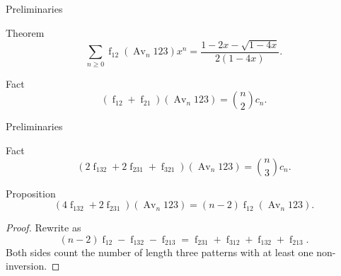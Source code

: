 \documentclass{beamer}
\DeclareMathOperator{\num}{f}
\DeclareMathOperator{\Av}{Av}
\newcommand{\Avn}{\Av_n   123 }
\begin{document}
\begin{frame}{Preliminaries}
  \pause

  \begin{block}{Theorem}
    $$\sum_{n \geq 0} \num_{12}(\Av_n 123) x^n = 
      \frac{1 - 2x - \sqrt{1-4x}}{2(1-4x)}.$$
  \end{block}

  \pause

  \begin{block}{Fact}
    $$ (\num_{12} + \num_{21})(\Avn)  = \binom{n}{2} c_n .$$ 
  \end{block}
\end{frame}

\begin{frame}{Preliminaries}
  
  \begin{block}{Fact}
    $$ (2 \num_{132} + 2 \num_{231} +
      \num_{321})(\Avn) = \binom{n}{3} c_n.$$
  \end{block}

  \pause

  \begin{block}{Proposition}
    $$ (4 \num_{132} + 2 \num_{231})(\Avn) =
      (n-2) \num_{12}(\Avn). $$
  \end{block}
  \pause

  \begin{proof}
    Rewrite as 
    $$ (n-2)\num_{12} - \num_{132} - \num_{213} = 
      \num_{231} + \num_{312}+ \num_{132} + \num_{213}. $$
    Both sides count the number of length three patterns with at least
    one non-inversion.
  \end{proof}

\end{frame}


% 
% 
  
\end{document}
